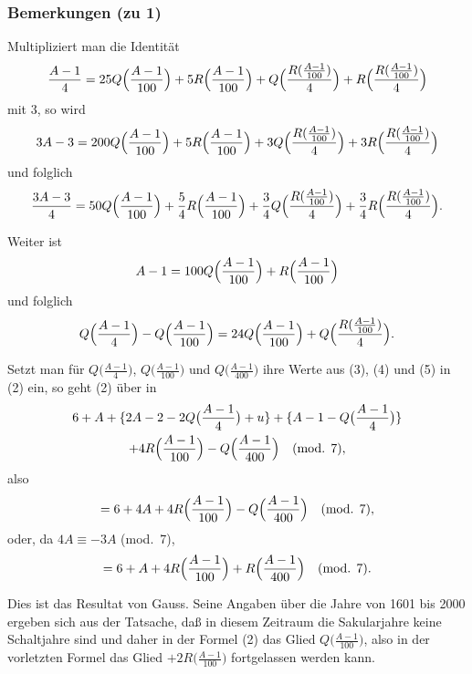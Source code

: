 \documentclass[12pt,a4paper]{article}
\theoremstyle{plain}
\theoremstyle{definition}
\theoremstyle{remark}
\begin{document}
\newpage

\subsubsection*{Bemerkungen (zu 1)}

Multipliziert man die Identität
\[
\frac{A - 1}{4} = 25Q\Bigl(\frac{A-1}{100}\Bigr) + 5R\Bigl(\frac{A-1}{100}\Bigr) + Q\Bigl(\frac{R(\frac{A-1}{100})}{4}\Bigr) + R\Bigl(\frac{R(\frac{A-1}{100})}{4}\Bigr)
\]
mit 3, so wird
\[
3A - 3 = 200Q\Bigl(\frac{A-1}{100}\Bigr) + 5R\Bigl(\frac{A-1}{100}\Bigr) + 3Q\Bigl(\frac{R(\frac{A-1}{100})}{4}\Bigr) + 3R\Bigl(\frac{R(\frac{A-1}{100})}{4}\Bigr)
\]
und folglich
\[
\frac{3A - 3}{4} = 50Q\Bigl(\frac{A-1}{100}\Bigr) + \frac{5}{4}R\Bigl(\frac{A-1}{100}\Bigr) + \frac{3}{4}Q\Bigl(\frac{R(\frac{A-1}{100})}{4}\Bigr) + \frac{3}{4}R\Bigl(\frac{R(\frac{A-1}{100})}{4}\Bigr).
\]

Weiter ist
\[
A - 1 = 100Q\Bigl(\frac{A-1}{100}\Bigr) + R\Bigl(\frac{A-1}{100}\Bigr)
\]
und folglich
\begin{equation}
Q\Bigl(\frac{A-1}{4}\Bigr) - Q\Bigl(\frac{A-1}{100}\Bigr) = 24Q\Bigl(\frac{A-1}{100}\Bigr) + Q\Bigl(\frac{R(\frac{A-1}{100})}{4}\Bigr).
\end{equation}

Setzt man für $Q\bigl(\frac{A-1}{4}\bigr)$, $Q\bigl(\frac{A-1}{100}\bigr)$ und $Q\bigl(\frac{A-1}{400}\bigr)$ ihre Werte aus (3), (4) und (5) in (2) ein, so geht (2) über in
\begin{multline*}
6 + A + \{2A - 2 - 2Q\bigl(\frac{A-1}{4}\bigr) + u\} + \{A - 1 - Q\bigl(\frac{A-1}{4}\bigr)\} \\
+ 4R\Bigl(\frac{A-1}{100}\Bigr) - Q\Bigl(\frac{A-1}{400}\Bigr) \quad \text{(mod. 7)},
\end{multline*}
also
\begin{multline*}
= 6 + 4A + 4R\Bigl(\frac{A-1}{100}\Bigr) - Q\Bigl(\frac{A-1}{400}\Bigr) \quad \text{(mod. 7)},
\end{multline*}
oder, da $4A \equiv -3A$ (mod.~7),
\begin{multline*}
= 6 + A + 4R\Bigl(\frac{A-1}{100}\Bigr) + R\Bigl(\frac{A-1}{400}\Bigr) \quad \text{(mod. 7)}.
\end{multline*}

Dies ist das Resultat von Gauss. Seine Angaben über die Jahre von 1601 bis 2000 ergeben sich aus der Tatsache, daß in diesem Zeitraum die Sakularjahre keine Schaltjahre sind und daher in der Formel (2) das Glied $Q\bigl(\frac{A-1}{100}\bigr)$, also in der vorletzten Formel das Glied $+2R\bigl(\frac{A-1}{100}\bigr)$ fortgelassen werden kann.
\end{document}
